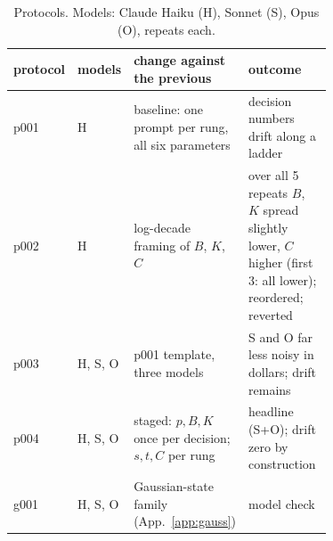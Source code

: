 \documentclass{article}
\begin{document}
\begin{table}[htbp]
\centering\footnotesize
\caption{Protocols. Models: Claude Haiku (H), Sonnet (S), Opus (O), \voiMemberKA{} repeats each.}
\label{tab:protocols}
\begin{tabular}{@{}llp{0.36\linewidth}p{0.35\linewidth}@{}}
\toprule
protocol & models & change against the previous & outcome\\
\midrule
p001 & H & baseline: one prompt per rung, all six parameters & decision numbers drift along a ladder\\
p002 & H & log-decade framing of $B$, $K$, $C$ & over all 5 repeats $B$, $K$ spread slightly lower, $C$ higher (first 3: all lower); reordered; reverted\\
p003 & H, S, O & p001 template, three models & S and O far less noisy in dollars; drift remains\\
p004 & H, S, O & staged: $p,B,K$ once per decision; $s,t,C$ per rung & headline (S+O); drift zero by construction\\
g001 & H, S, O & Gaussian-state family (App.~\ref{app:gauss}) & model check\\
\bottomrule
\end{tabular}
\end{table}

\begin{table}[htbp]
\centering
\caption{The consistency check per protocol: dispersion of the pooled p50 across the rungs of each ladder (CV for probabilities, $\log_{10}$ range for dollars); the ratio column divides CV($p$) by the mean CV of $s$ and $t$; last column: $p,B,K$ flatter than $s,t,C$. Top to bottom: p001 Haiku, p003 Sonnet+Opus, p004 Sonnet+Opus (headline).}
\label{tab:consistency}
\\[4pt]
\\[4pt]
\end{table}
\end{document}
